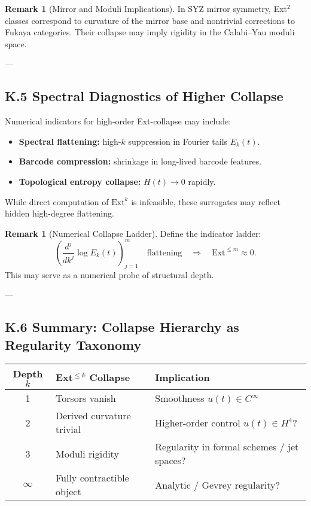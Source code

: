 \documentclass[11pt]{article}
\theoremstyle{definition}
\newtheorem{remark}[theorem]{Remark}
\begin{document}
\begin{remark}[Mirror and Moduli Implications]
In SYZ mirror symmetry, Ext$^2$ classes correspond to curvature of the mirror base and nontrivial corrections to Fukaya categories.  
Their collapse may imply rigidity in the Calabi--Yau moduli space.
\end{remark}

---

\subsection*{K.5 Spectral Diagnostics of Higher Collapse}

Numerical indicators for high-order Ext-collapse may include:
\begin{itemize}
  \item \textbf{Spectral flattening:} high-$k$ suppression in Fourier tails \( E_k(t) \).
  \item \textbf{Barcode compression:} shrinkage in long-lived barcode features.
  \item \textbf{Topological entropy collapse:} \( H(t) \to 0 \) rapidly.
\end{itemize}

While direct computation of \( \mathrm{Ext}^k \) is infeasible, these surrogates may reflect hidden high-degree flattening.

\begin{remark}[Numerical Collapse Ladder]
Define the indicator ladder:
\[
\left( \frac{d^j}{dk^j} \log E_k(t) \right)_{j=1}^m \quad \text{flattening} \quad \Rightarrow \quad \mathrm{Ext}^{\leq m} \approx 0.
\]
This may serve as a numerical probe of structural depth.
\end{remark}

---

\subsection*{K.6 Summary: Collapse Hierarchy as Regularity Taxonomy}

\begin{center}
\renewcommand{\arraystretch}{1.3}
\begin{tabular}{|c|l|l|}
\hline
\textbf{Depth \( k \)} & \textbf{Ext$^{\leq k}$ Collapse} & \textbf{Implication} \\
\hline
1 & Torsors vanish & Smoothness $u(t) \in C^\infty$ \\
2 & Derived curvature trivial & Higher-order control $u(t) \in H^4$? \\
3 & Moduli rigidity & Regularity in formal schemes / jet spaces? \\
$\infty$ & Fully contractible object & Analytic / Gevrey regularity? \\
\hline
\end{tabular}
\end{center}
\end{document}
